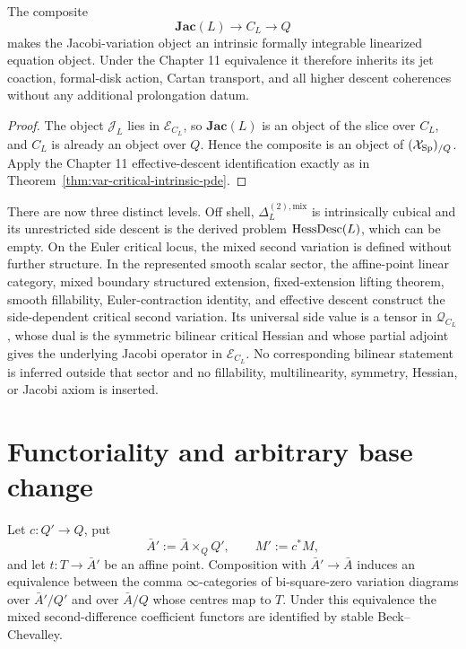 \begin{proposition}
\label{prop:var-jacobi-formal-integrability}
The composite
\[
    \mathbf{Jac}(L)\longrightarrow C_L\longrightarrow Q
\]
makes the Jacobi-variation object an intrinsic formally integrable linearized equation object.  Under the Chapter 11 equivalence it therefore inherits its jet coaction, formal-disk action, Cartan transport, and all higher descent coherences without any additional prolongation datum.
\end{proposition}

\begin{proof}
The object \(\mathcal J_L\) lies in \(\mathcal E_{C_L}\), so \(\mathbf{Jac}(L)\) is an object of the slice over \(C_L\), and \(C_L\) is already an object over \(Q\).  Hence the composite is an object of \((\mathcal{X}_{\mathrm{Sp}})_{/Q}\).  Apply the Chapter 11 effective-descent identification exactly as in Theorem~\ref{thm:var-critical-intrinsic-pde}.
\end{proof}

\begin{remark}
\label{rem:var-hessian-jacobi-scope}
There are now three distinct levels.  Off shell, \(\Delta_L^{(2),\mathrm{mix}}\) is intrinsically cubical and its unrestricted side descent is the derived problem \(\operatorname{HessDesc}(L)\), which can be empty.  On the Euler critical locus, the mixed second variation is defined without further structure.  In the represented smooth scalar sector, the affine-point linear category, mixed boundary structured extension, fixed-extension lifting theorem, smooth fillability, Euler-contraction identity, and effective descent construct the side-dependent critical second variation.  Its universal side value is a tensor in \(\mathcal Q_{C_L}\), whose dual is the symmetric bilinear critical Hessian and whose partial adjoint gives the underlying Jacobi operator in \(\mathcal E_{C_L}\).  No corresponding bilinear statement is inferred outside that sector and no fillability, multilinearity, symmetry, Hessian, or Jacobi axiom is inserted.
\end{remark}

\section{Functoriality and arbitrary base change}
\label{sec:var-base-change}

\begin{proposition}
\label{prop:var-second-affine-base-change}
Let \(c:Q'\to Q\), put
\[
    \bar A':=\bar A\times_QQ',
    \qquad
    M':=c^*M,
\]
and let \(t:T\to\bar A'\) be an affine point. Composition with \(\bar A'\to\bar A\) induces an equivalence between the comma \(\infty\)-categories of bi-square-zero variation diagrams over \(\bar A'/Q'\) and over \(\bar A/Q\) whose centres map to \(T\). Under this equivalence the mixed second-difference coefficient functors are identified by stable Beck--Chevalley.
\end{proposition}


